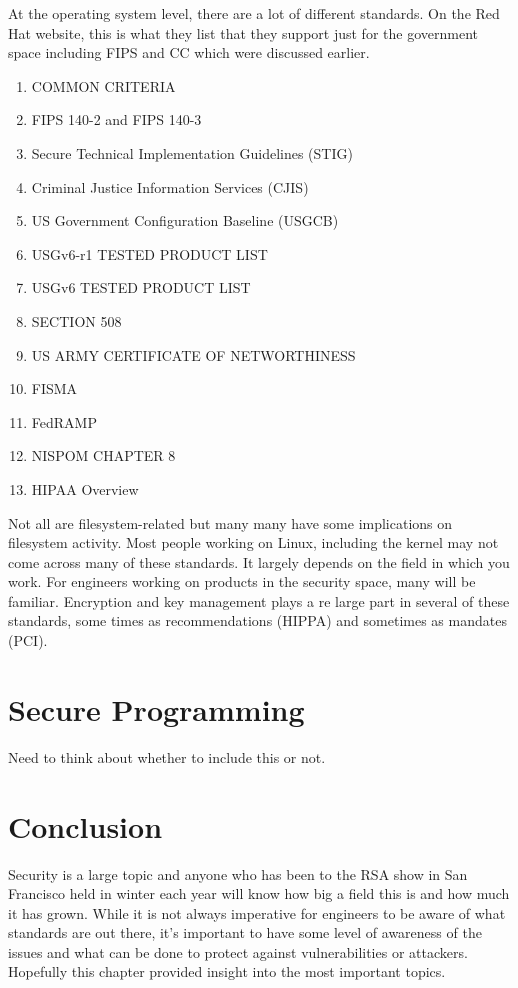 At the operating system level, there are a lot of different standards. On the Red Hat website, this is what they list that they support just for the government space including FIPS and CC which were discussed earlier.

\begin{enumerate}
	\item COMMON CRITERIA
	\item FIPS 140-2 and FIPS 140-3
	\item Secure Technical Implementation Guidelines (STIG)
	\item Criminal Justice Information Services (CJIS)
	\item US Government Configuration Baseline (USGCB)
	\item USGv6-r1 TESTED PRODUCT LIST
	\item USGv6 TESTED PRODUCT LIST
	\item SECTION 508
	\item US ARMY CERTIFICATE OF NETWORTHINESS
	\item FISMA
	\item FedRAMP
	\item NISPOM CHAPTER 8
	\item HIPAA Overview
\end{enumerate}

\noindent
Not all are filesystem-related but many many have some implications on filesystem activity. Most people working on Linux, including the kernel may not come across many of these standards. It largely depends on the field in which you work. For engineers working on products in the security space, many will be familiar. Encryption and key management plays a re large part in several of these standards, some times as recommendations (HIPPA) and sometimes as mandates (PCI).

\section{Secure Programming}


Need to think about whether to include this or not.

\section{Conclusion}

Security is a large topic and anyone who has been to the RSA show in San Francisco held in winter each year will know how big a field this is and how much it has grown. While it is not always imperative for engineers to be aware of what standards are out there, it's important to have some level of awareness of the issues and what can be done to protect against vulnerabilities or attackers. Hopefully this chapter provided insight into the most important topics.

